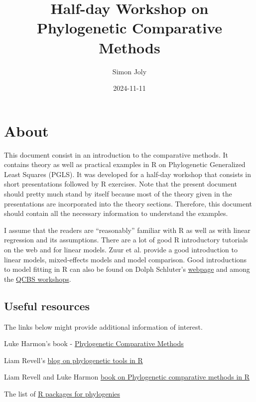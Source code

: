 \documentclass[
]{book}
\title{Half-day Workshop on Phylogenetic Comparative Methods}
\author{Simon Joly}
\date{2024-11-11}
\begin{document}
\maketitle

{
\setcounter{tocdepth}{1}
\tableofcontents
}
\chapter{About}\label{about}

This document consist in an introduction to the comparative methods. It contains theory as well as practical examples in R on Phylogenetic Generalized Least Squares (PGLS). It was developed for a half-day workshop that consists in short presentations followed by R exercises. Note that the present document should pretty much stand by itself because most of the theory given in the presentations are incorporated into the theory sections. Therefore, this document should contain all the necessary information to understand the examples.

I assume that the readers are ``reasonably'' familiar with R as well as with linear regression and its assumptions. There are a lot of good R introductory tutorials on the web and for linear models. Zuur et al. \citep{zuur2007analysing} provide a good introduction to linear models, mixed-effects models and model comparison. Good introductions to model fitting in R can also be found on Dolph Schluter's \href{https://www.zoology.ubc.ca/~schluter/R/fit-model/}{webpage} and among the \href{http://qcbs.ca/wiki/r_workshop4}{QCBS workshops}.

\section{Useful resources}\label{useful-resources}

The links below might provide additional information of interest.

Luke Harmon's book - \href{https://lukejharmon.github.io/pcm/}{Phylogenetic Comparative Methods}

Liam Revell's \href{http://blog.phytools.org/}{blog on phylogenetic tools in R}

Liam Revell and Luke Harmon \href{https://press.princeton.edu/books/ebook/9780691219042/phylogenetic-comparative-methods-in-r}{book on Phylogenetic comparative methods in R}

The list of \href{https://cran.r-project.org/web/views/Phylogenetics.html}{R packages for phylogenies}
\end{document}
